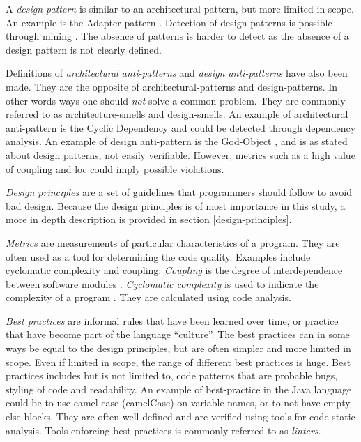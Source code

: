 \documentclass[pdftex,10pt,b5paper,twoside]{report}
\begin{document}
A \textit{design pattern} is similar to an architectural pattern, but more limited in scope. An example is the Adapter pattern \cite{Adapterp54:online}. Detection of design patterns is possible through mining \cite{TEKIN2014406}. The absence of patterns is harder to detect as the absence of a design pattern is not clearly defined.

Definitions of \textit{architectural anti-patterns} and \textit{design anti-patterns} have also been made. They are the opposite of architectural-patterns and design-patterns. In other words ways one should {\em not} solve a common problem. They are commonly referred to as architecture-smells and design-smells. An example of architectural anti-pattern is the Cyclic Dependency \cite{cyclicdependency} and could be detected through dependency analysis. An example of design anti-pattern is the God-Object \cite{Godobjec14:online}, and is as stated about design patterns, not easily verifiable. However, metrics such as a high value of coupling and \gls{loc} could imply possible violations.


\textit{Design principles} are a set of guidelines that programmers should follow to avoid bad design. Because the design principles is of most importance in this study, a more in depth description is provided in section \ref{design-principles}.

\textit{Metrics} are measurements of particular characteristics of a program. They are often used as a tool for determining the code quality. Examples include cyclomatic complexity and coupling. \textit{Coupling} is the degree of interdependence between software modules \cite{coupling}. \textit{Cyclomatic complexity} is used to indicate the complexity of a program \cite{Cyclomat54:online}. They are calculated using code analysis.

\textit{Best practices} are informal rules that have been learned over time, or practice that have become part of the language ``culture''. The best practices can in some ways be equal to the design principles, but are often simpler and more limited in scope. Even if limited in scope, the range of different best practices is huge. Best practices includes but is not limited to, code patterns that are probable bugs, styling of code and readability. An example of best-practice in the Java language could be to use camel case (camelCase) \cite{camelcase} on variable-names, or to not have empty else-blocks. They are often well defined and are verified using tools for code static analysis. Tools enforcing best-practices is commonly referred to as \textit{linters}.
\end{document}
